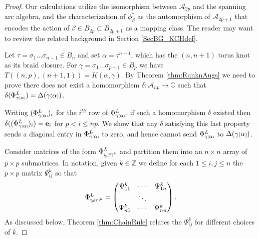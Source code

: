 \documentclass[11pt]{amsart}
\def\Z{{\mathbb Z}}
\def\C{{\mathbb C}}
\def\A{{\mathcal A}}
\def\s{{\sigma}}
\newcommand*{\smallp}[1]{\scalebox{.75}{\ensuremath#1}}
\newcommand*{\subsmallp}[1]{\scalebox{.5}{\ensuremath#1}}
\newcommand{\subpp}[2][p]{\imath_{\hspace*{-1pt}#1}\hspace*{-.5pt}\subsmallp(#2\subsmallp)}
\theoremstyle{definition}
\begin{document}
\begin{proof}
Our calculations utilize the isomorphism between $\A_{2p}$ and the spanning arc algebra, and the characterization of $\phi^{\ast}_{\beta}$ as the automorphism of $\A_{2p+1}$ that encodes the action of $\beta\in B_{2p}\subset B_{2p+1}$ as a mapping class. The reader may want to review the related background in Section \ref{SecBG_KCHdef}.

Let $\tau = \s_1\ldots\s_{n-1}\in B_n$ and set $\alpha = \tau^{n+1}$, which has the $(n,n+1)$ torus knot as its braid closure. For $\gamma=\s_1\ldots\s_{p-1}\in B_p$ we have $T((n,p),(n+1,1)) = K(\alpha,\gamma)$. By Theorem \ref{thm:RanknAugs} we need to prove there does not exist a homomorphism $\delta:\A_{np}\to\C$ such that $\delta(\Phi_{\gamma\subsmallp(\alpha\subsmallp)}^L)=\Delta(\gamma\smallp(\alpha\smallp))$. 

Writing $(\Phi_{\gamma\subsmallp(\alpha\subsmallp)}^L)_i$ for the $i^{th}$ row of $\Phi_{\gamma\subsmallp(\alpha\subsmallp)}^L$, if such a homomorphism $\delta$ existed then $\delta((\Phi_{\gamma\subsmallp(\alpha\subsmallp)}^L)_i) = {\bf e}_{i}$ for $p < i \le np$. We show that any $\delta$ satisfying this last property sends a diagonal entry in $\Phi_{\gamma\subsmallp(\alpha\subsmallp)}^L$ to zero, and hence cannot send $\Phi_{\gamma\subsmallp(\alpha\subsmallp)}^L$ to $\Delta(\gamma\smallp(\alpha\smallp))$.

Consider matrices of the form $\Phi_{\subpp\tau^k}^L$ and partition them into an $n\times n$ array of $p\times p$ submatrices. In notation, given $k\in\Z$ we define for each $1\le i,j\le n$ the $p\times p$ matrix $\Psi_{ij}^k$ so that
    \[ \Phi_{\subpp\tau^k}^L = \begin{pmatrix}\Psi_{11}^k & \cdots & \Psi_{1n}^k \\ & \ddots & \\ \Psi_{n1}^k & \cdots & \Psi_{nn}^k\end{pmatrix}.\]
As discussed below, Theorem \ref{thm:ChainRule} relates the $\Psi_{ij}^k$ for different choices of $k$. %



\end{proof}
\end{document}
